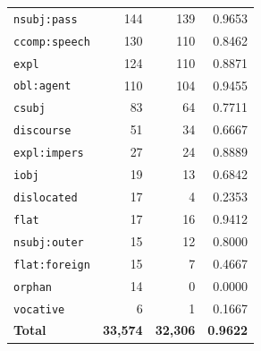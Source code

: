 \begin{table}[ht]
\begin{tabular}{lrrr}
\texttt{nsubj\!:\!pass} & 144 & 139 & 0.9653 \\
\texttt{ccomp\!:\!speech} & 130 & 110 & 0.8462 \\
\texttt{expl} & 124 & 110 & 0.8871 \\
\texttt{obl\!:\!agent} & 110 & 104 & 0.9455 \\
\texttt{csubj} & 83 & 64 & 0.7711 \\
\texttt{discourse} & 51 & 34 & 0.6667 \\
\texttt{expl\!:\!impers} & 27 & 24 & 0.8889 \\
\texttt{iobj} & 19 & 13 & 0.6842 \\
\texttt{dislocated} & 17 & 4 & 0.2353 \\
\texttt{flat} & 17 & 16 & 0.9412 \\
\texttt{nsubj\!:\!outer} & 15 & 12 & 0.8000 \\
\texttt{flat\!:\!foreign} & 15 & 7 & 0.4667 \\
\texttt{orphan} & 14 & 0 & 0.0000 \\
\texttt{vocative} & 6 & 1 & 0.1667 \\
\midrule
\textbf{Total} & \textbf{33,574} & \textbf{32,306} & \textbf{0.9622} \\
\bottomrule
\end{tabular}
\end{table}
